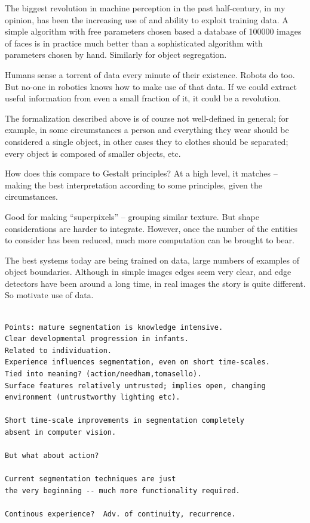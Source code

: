 
The biggest revolution in machine perception in the past half-century, 
in my opinion, has been the increasing use of and ability to exploit 
training data.  A simple algorithm with free parameters chosen based a 
database of 100000 images of faces is in practice much better than a 
sophisticated algorithm with parameters chosen by hand.  Similarly for 
object segregation.

Humans sense a torrent of data every minute of their existence.  Robots 
do too.  But no-one in robotics knows how to make use of that data.  If 
we could extract useful information from even a small fraction of it, it 
could be a revolution.




The formalization described above is of course
not well-defined in general; for example, in some
circumstances a person and everything they wear should be
considered a single object, in other cases they to clothes
should be separated; every object is composed of smaller
objects, etc.  

How does this compare to Gestalt principles?  At a high level, it
matches -- making the best interpretation according to some
principles, given the circumstances.

Good for making ``superpixels'' -- grouping similar texture.
But shape considerations are harder to integrate.  However,
once the number of the entities to consider has been 
reduced, much more computation can be brought to bear.

The best systems today are being trained on data, large numbers
of examples of object boundaries.  Although in simple images
edges seem very clear, and edge detectors have been around
a long time, in real images the story is quite different.
So motivate use of data.




\begin{verbatim}

Points: mature segmentation is knowledge intensive.
Clear developmental progression in infants.
Related to individuation.
Experience influences segmentation, even on short time-scales.
Tied into meaning? (action/needham,tomasello).
Surface features relatively untrusted; implies open, changing 
environment (untrustworthy lighting etc).

Short time-scale improvements in segmentation completely
absent in computer vision.

But what about action?

Current segmentation techniques are just
the very beginning -- much more functionality required.

Continous experience?  Adv. of continuity, recurrence.

\end{verbatim}


